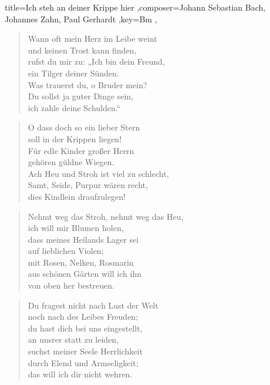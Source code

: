 \documentclass[]{leadsheet}
\begin{document}
\begin{song}{title={Ich steh an deiner Krippe hier
},composer={Johann Sebastian Bach, Johannes Zahn, Paul Gerhardt
},key={Bm
},}
\begin{verse}
Wann oft mein Herz im Leibe weint \\
und keinen Trost kann finden, \\
rufst du mir zu: „Ich bin dein Freund, \\
ein Tilger deiner Sünden. \\
Was trauerst du, o Bruder mein? \\
Du sollst ja guter Dinge sein, \\
ich zahle deine Schulden.“ \\
\end{verse}

\begin{verse}
O dass doch so ein lieber Stern \\
soll in der Krippen liegen! \\
Für edle Kinder großer Herrn \\
gehören güldne Wiegen. \\
Ach Heu und Stroh ist viel zu schlecht, \\
Samt, Seide, Purpur wären recht, \\
dies Kindlein draufzulegen! \\
\end{verse}

\begin{verse}
Nehmt weg das Stroh, nehmt weg das Heu, \\
ich will mir Blumen holen, \\
dass meines Heilands Lager sei \\
auf lieblichen Violen; \\
mit Rosen, Nelken, Rosmarin \\
aus schönen Gärten will ich ihn \\
von oben her bestreuen. \\
\end{verse}

\begin{verse}
Du fragest nicht nach Lust der Welt \\
noch nach des Leibes Freuden; \\
du hast dich bei uns eingestellt, \\
an unsrer statt zu leiden, \\
suchst meiner Seele Herrlichkeit \\
durch Elend und Armseligkeit; \\
das will ich dir nicht wehren. \\
\end{verse}


\end{song}
\end{document}
